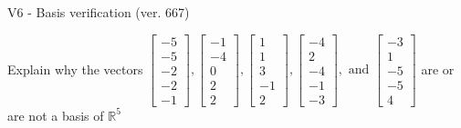 \begin{exercise}
  \begin{exerciseTitle}V6 - Basis verification (ver. 667)\end{exerciseTitle}
  \begin{exerciseStatement}
    Explain why the vectors \(\left[\begin{array}{r}
-5 \\
-5 \\
-2 \\
-2 \\
-1
\end{array}\right] , \left[\begin{array}{r}
-1 \\
-4 \\
0 \\
2 \\
2
\end{array}\right] , \left[\begin{array}{r}
1 \\
1 \\
3 \\
-1 \\
2
\end{array}\right] , \left[\begin{array}{r}
-4 \\
2 \\
-4 \\
-1 \\
-3
\end{array}\right] , \text{ and } \left[\begin{array}{r}
-3 \\
1 \\
-5 \\
-5 \\
4
\end{array}\right]\) are or are not a basis of \(\mathbb{R}^5\)	



\end{exerciseStatement}
\end{exercise}

